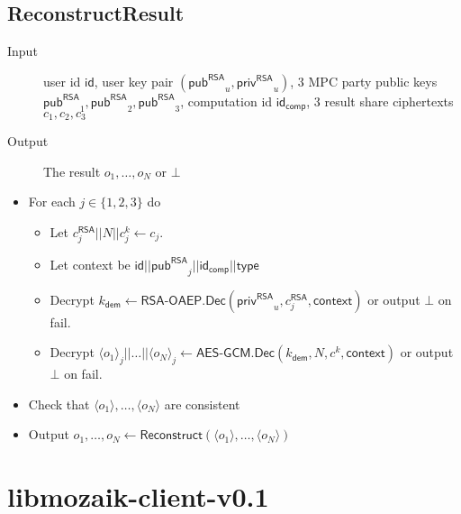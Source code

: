 \documentclass[10pt,a4paper]{article}
\newcommand{\pub}{\ensuremath{\mathsf{pub}}}
\newcommand{\priv}{\ensuremath{\mathsf{priv}}}
\newcommand{\pubRSA}{\ensuremath{\pub^{\mathsf{RSA}}}}
\newcommand{\privRSA}{\ensuremath{\priv^{\mathsf{RSA}}}}
\newcommand{\id}{\ensuremath{\mathsf{id}}}
\newcommand{\idcomp}{\ensuremath{\mathsf{id}_{\mathsf{comp}}}}
\newcommand{\type}{\ensuremath{\mathsf{type}}}
\newcommand{\kdem}{\ensuremath{k_{\mathsf{dem}}}}
\newcommand{\share}[1]{\ensuremath{\langle #1 \rangle}}
\newcommand{\RSAOAEP}{\ensuremath{\textsf{RSA-OAEP}}}
\newcommand{\AESGCM}{\ensuremath{\textsf{AES-GCM}}}
\newcommand{\Decrypt}{\ensuremath{\textsf{Dec}}}
\begin{document}
{\subsection{ReconstructResult}
\begin{description}
	\item[Input] user id $\id$, user key pair $(\pubRSA_u, \privRSA_u)$, 3 MPC party public keys $\pubRSA_1, \pubRSA_2, \pubRSA_3$, computation id $\idcomp$, 3 result share ciphertexts $c_1, c_2, c_3$
	\item[Output] The result $o_1, \dots, o_N$ or $\bot$
\end{description}
\begin{itemize}
	\item For each $j \in \{1,2,3\}$ do
	\begin{itemize}
		\item Let $c^{\mathsf{RSA}}_j||N||c^k_j \gets c_j$.
		\item Let context be $\id||\pubRSA_j||\idcomp||\type$
		\item Decrypt $\kdem \gets \RSAOAEP.\Decrypt(\privRSA_u,c^{\mathsf{RSA}}_j,\mathsf{context})$ or output $\bot$ on fail.
		\item Decrypt $\share{o_1}_j||\dots||\share{o_N}_j \gets \AESGCM.\Decrypt(\kdem,N,c^k,\mathsf{context})$ or output $\bot$ on fail.
	\end{itemize}
	\item Check that $\share{o_1}, \dots, \share{o_N}$ are consistent
	\item Output $o_1, \dots, o_N \gets \mathsf{Reconstruct}(\share{o_1}, \dots, \share{o_N})$
\end{itemize}
}


\section{libmozaik-client-v0.1}
\end{document}
